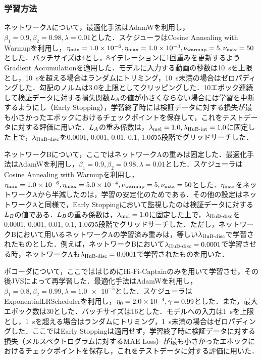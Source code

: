 \subsubsection{学習方法}
ネットワークAについて，最適化手法はAdamW\cite{loshchilov2017decoupled}を利用し，$\beta_{1} = 0.9, \beta_{2} = 0.98, \lambda = 0.01$とした．スケジューラはCosine Annealing with Warmupを利用し，$\eta_{\text{min}} = 1.0 \times 10^{-6}, \eta_{\text{max}} = 1.0 \times 10^{-3}, \nu_{\text{warmup}} = 5, \nu_{\text{max}} = 50$とした．バッチサイズは4とし，8イテレーションに1回重みを更新するようGradient Accumulationを適用した．モデルに入力する動画の秒数は\SI{10}{\s}を上限とし，\SI{10}{\s}を超える場合はランダムにトリミング，\SI{10}{\s}未満の場合はゼロパディングした．勾配のノルムは3.0を上限としてクリッピングした．10エポック連続して検証データに対する損失関数$L_{A}$の値が小さくならない場合には学習を中断するようにし（Early Stopping），学習終了時には検証データに対する損失が最も小さかったエポックにおけるチェックポイントを保存して，これをテストデータに対する評価に用いた．$L_{A}$の重み係数は，$\lambda_{\text{mel}} = 1.0, \lambda_{\text{HuB-int}} = 1.0$に固定した上で，$\lambda_{\text{HuB-disc}}$を0.0001, 0.001, 0.01, 0.1, 1.0の5段階でグリッドサーチした．

ネットワークBについて，ここではネットワークAの重みは固定した．最適化手法はAdamWを利用し，$\beta_{1} = 0.9, \beta_{2} = 0.98, \lambda = 0.01$とした．スケジューラはCosine Annealing with Warmupを利用し，$\eta_{\text{min}} = 1.0 \times 10^{-6}, \eta_{\text{max}} = 5.0 \times 10^{-4}, \nu_{\text{warmup}} = 5, \nu_{\text{max}} = 50$とした．$\eta_{\text{max}}$をネットワークAから半減したのは，学習の安定化のためである．その他の設定はネットワークAと同様で，Early Stoppingにおいて監視したのは検証データに対する$L_{B}$の値である．$L_{B}$の重み係数は，$\lambda_{\text{mel}} = 1.0$に固定した上で，$\lambda_{\text{HuB-disc}}$を0.0001, 0.001, 0.01, 0.1, 1.0の5段階でグリッドサーチした．ただし，ネットワークBにおいて用いるネットワークAの学習済み重みは，等しい$\lambda_{\text{HuB-disc}}$で学習されたものとした．例えば，ネットワークBにおいて$\lambda_{\text{HuB-disc}} = 0.0001$で学習させる時，ネットワークAも$\lambda_{\text{HuB-disc}} = 0.0001$で学習されたものを用いた．

ボコーダについて，ここでははじめにHi-Fi-Captainのみを用いて学習させ，その後JVSによって再学習した．最適化手法はAdamWを利用し，$\beta_{1} = 0.8, \beta_{2} = 0.99, \lambda = \num{1.0e-5}$とした．スケジューラはExponentialLRSchedulerを利用し，$\eta_{0} = 2.0 \times 10^{-4}, \gamma = 0.99$とした．また，最大エポック数は30とした．バッチサイズは16とした．モデルへの入力は\SI{1}{\s}を上限とし，\SI{1}{\s}を超える場合はランダムにトリミング，\SI{1}{\s}未満の場合はゼロパディングした．ここではEarly Stoppingは適用せず，学習終了時に検証データに対する損失（メルスペクトログラムに対するMAE Loss）が最も小さかったエポックにおけるチェックポイントを保存し，これをテストデータに対する評価に用いた．

